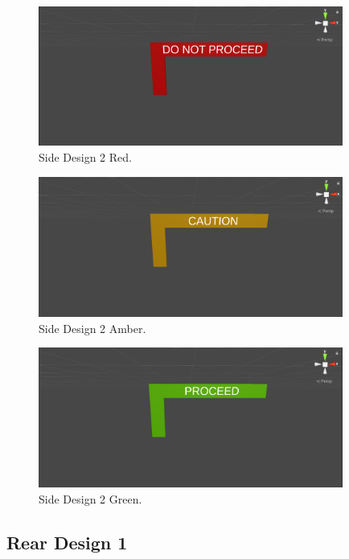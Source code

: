 \documentclass{l4proj}
\begin{document}
\begin{figure}[H]
    \centering
    \includegraphics[width=10cm]{images/side_design2.1.png}
    \caption{Side Design 2 Red.}
    \label{fig:side_design2.1}
\end{figure}

\begin{figure}[H]
    \centering
    \includegraphics[width=10cm]{images/side_design2.2.png}
    \caption{Side Design 2 Amber.}
    \label{fig:side_design2.2}
\end{figure}

\begin{figure}[H]
    \centering
    \includegraphics[width=10cm]{images/side_design2.3.png}
    \caption{Side Design 2 Green.}
    \label{fig:side_design2.3}
\end{figure}

\subsection{Rear Design 1}
\end{document}
